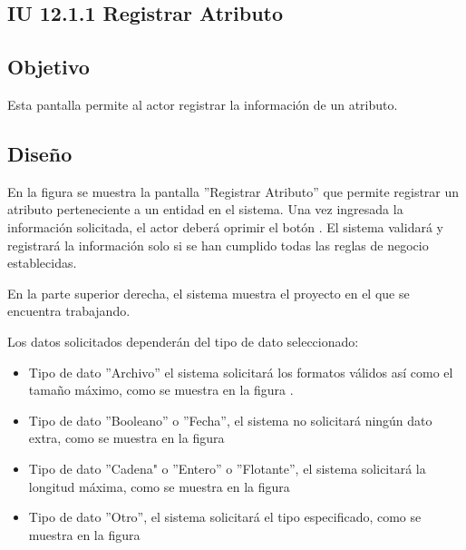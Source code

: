 \subsection{IU 12.1.1 Registrar Atributo}

\subsection{Objetivo}
	Esta pantalla permite al actor registrar la información de un atributo.
\subsection{Diseño}
	En la figura  se muestra la pantalla ''Registrar Atributo'' que permite registrar un atributo perteneciente a un entidad en el sistema.
	Una vez ingresada la información solicitada, el actor deberá oprimir el botón  . El sistema validará y registrará la información solo si se han cumplido todas las reglas de negocio establecidas.
	
	En la parte superior derecha, el sistema muestra el proyecto en el que se encuentra trabajando.
	
	
	Los datos solicitados dependerán del tipo de dato seleccionado:
	\begin{itemize}
		\item Tipo de dato ''Archivo'' el sistema solicitará los formatos válidos así como el tamaño máximo, como se muestra en la figura .
		\item Tipo de dato ''Booleano'' o ''Fecha'', el sistema no solicitará ningún dato extra, como se muestra en la figura 
		\item Tipo de dato ''Cadena" o ''Entero'' o ''Flotante'', el sistema solicitará la longitud máxima, como se muestra en la figura 
		\item Tipo de dato ''Otro'', el sistema solicitará el tipo especificado, como se muestra en la figura 
	\end{itemize}

